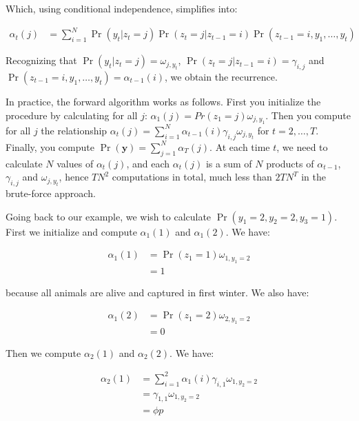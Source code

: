 \documentclass[
  12pt,
]{krantz}
\begin{document}
Which, using conditional independence, simplifies into:

\begin{align*}
\alpha_t(j) &= \sum_{i=1}^N \Pr(y_t | z_t = j) \Pr(z_t = j | z_{t-1} = i) \Pr(z_{t-1} = i, y_1, \ldots, y_t)
\end{align*}

Recognizing that \(\Pr(y_{t}|z_{t}=j)=\omega_{j,y_t}\), \(\Pr(z_{t} = j | z_{t-1} = i) = \gamma_{i,j}\) and \(\Pr(z_{t-1} = i, y_1, \ldots, y_t) = \alpha_{t-1}(i)\), we obtain the recurrence.

In practice, the forward algorithm works as follows. First you initialize the procedure by calculating for all \(j\): \(\alpha_1(j) = Pr(z_1 = j) \omega_{j,y_1}\). Then you compute for all \(j\) the relationship \(\alpha_t(j) = \displaystyle{\sum_{i=1}^N \alpha_{t-1}(i) \gamma_{i,j} \omega_{j,y_t}}\) for \(t = 2, \ldots, T\). Finally, you compute \(\Pr(\mathbf{y}) = \displaystyle{\sum_{j=1}^N\alpha_T(j)}\). At each time \(t\), we need to calculate \(N\) values of \(\alpha_t(j)\), and each \(\alpha_t(j)\) is a sum of \(N\) products of \(\alpha_{t-1}\), \(\gamma_{i,j}\) and \(\omega_{j,y_t}\), hence \(TN^2\) computations in total, much less than \(2TN^T\) in the brute-force approach.

Going back to our example, we wish to calculate \(\Pr(y_1 = 2, y_2 = 2, y_3 = 1)\). First we initialize and compute \(\alpha_1(1)\) and \(\alpha_1(2)\). We have:

\begin{align*}
\alpha_1(1) &= \Pr(z_1=1) \omega_{1,y_1=2}\\
            &= 1
\end{align*}

because all animals are alive and captured in first winter. We also have:

\begin{align*}
\alpha_1(2) &= \Pr(z_1=2) \omega_{2,y_1=2}\\
            &= 0
\end{align*}

Then we compute \(\alpha_2(1)\) and \(\alpha_2(2)\). We have:

\begin{align*}
\alpha_2(1) &= \sum_{i=1}^2 \alpha_1(i) \gamma_{i,1} \omega_{1,y_2=2}\\
            &= \gamma_{1,1} \omega_{1,y_2=2}\\
            &= \phi p
\end{align*}
\end{document}
